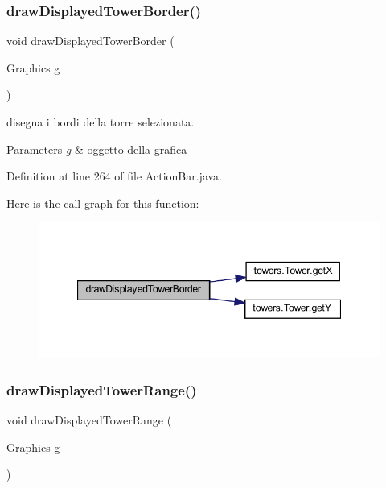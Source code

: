 \subsubsection{\texorpdfstring{draw\+Displayed\+Tower\+Border()}{drawDisplayedTowerBorder()}}
{\footnotesize\ttfamily void draw\+Displayed\+Tower\+Border (\begin{DoxyParamCaption}\item[{Graphics}]{g }\end{DoxyParamCaption})}



disegna i bordi della torre selezionata. 


\begin{DoxyParams}{Parameters}
{\em g} & oggetto della grafica \\
\hline
\end{DoxyParams}


Definition at line 264 of file Action\+Bar.\+java.

Here is the call graph for this function\+:\nopagebreak
\begin{figure}[H]
\begin{center}
\leavevmode
\includegraphics[width=347pt]{classui_1_1_action_bar_a04a438da46ac439f00343a12939ada6e_cgraph}
\end{center}
\end{figure}
\mbox{\label{classui_1_1_action_bar_a1f012512b669e57c49c1957905a35107}} 
\subsubsection{\texorpdfstring{draw\+Displayed\+Tower\+Range()}{drawDisplayedTowerRange()}}
{\footnotesize\ttfamily void draw\+Displayed\+Tower\+Range (\begin{DoxyParamCaption}\item[{Graphics}]{g }\end{DoxyParamCaption})}




